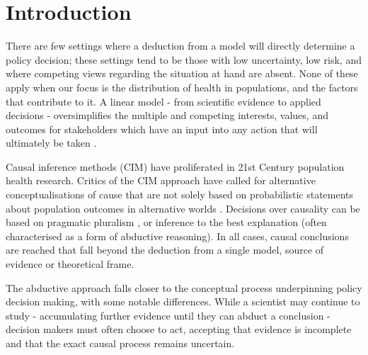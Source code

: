 \documentclass[review]{elsarticle}
\begin{document}
\section{Introduction}


There are few settings where a deduction from a model will directly determine a policy decision; these settings tend to be those with low uncertainty, low risk, and where competing views regarding the situation at hand are absent. None of these apply when our focus is the distribution of health in populations, and the factors that contribute to it. A linear model - from scientific evidence to applied decisions - oversimplifies the multiple and competing interests, values, and outcomes for stakeholders which have an input into any action that will ultimately be taken \citep{oliver2014}.


Causal inference methods (CIM) have proliferated in 21st Century population health research. Critics of the CIM approach have called for alternative conceptualisations of cause that are not solely based on probabilistic statements about population outcomes in alternative worlds \citep{krieger2016}. Decisions over causality can be based on pragmatic pluralism \citep{vandenbroucke2016}, or inference to the best explanation \citep{lipton2003,krieger2016} (often characterised as a form of abductive reasoning).  In all cases, causal conclusions are reached that fall beyond the deduction from a single model, source of evidence or theoretical frame.

The abductive approach falls closer to the conceptual process underpinning policy decision making, with some notable differences. While a scientist may continue to study - accumulating further evidence until they can abduct a conclusion - decision makers must often choose to act, accepting that evidence is incomplete and that the exact causal process remains uncertain.
\end{document}
